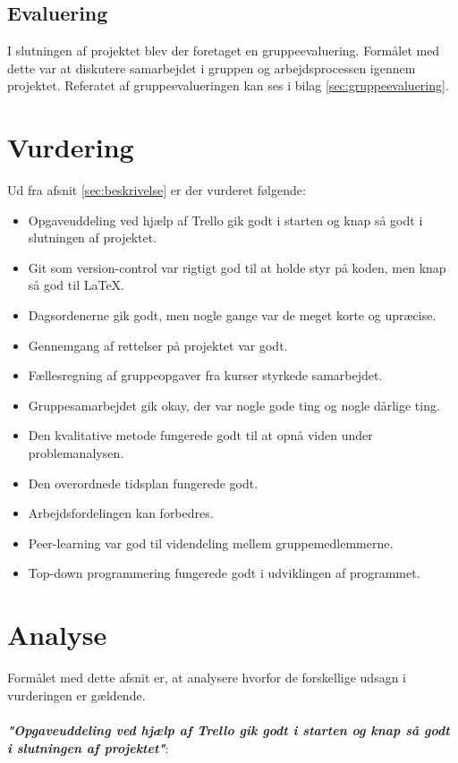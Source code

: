 \documentclass[oneside,a4paper,titlepage]{article}
\begin{document}
\subsection{Evaluering}

I slutningen af projektet blev der foretaget en gruppeevaluering. Formålet med dette var at diskutere samarbejdet i gruppen og arbejdsprocessen igennem projektet. Referatet af gruppeevalueringen kan ses i bilag \ref{sec:gruppeevaluering}.

\section{Vurdering}
Ud fra afsnit \ref{sec:beskrivelse} er der vurderet følgende:
\begin{itemize}
  \item Opgaveuddeling ved hjælp af Trello gik godt i starten og knap så godt i slutningen af projektet.
  \item Git som version-control var rigtigt god til at holde styr på koden, men knap så god til LaTeX.
  \item Dagsordenerne gik godt, men nogle gange var de meget korte og upræcise.
  \item Gennemgang af rettelser på projektet var godt.
  \item Fællesregning af gruppeopgaver fra kurser styrkede samarbejdet.
  \item Gruppesamarbejdet gik okay, der var nogle gode ting og nogle dårlige ting. 
  \item Den kvalitative metode fungerede godt til at opnå viden under problemanalysen.
  \item Den overordnede tidsplan fungerede godt.
  \item Arbejdsfordelingen kan forbedres.
  \item Peer-learning var god til videndeling mellem gruppemedlemmerne.
  \item Top-down programmering fungerede godt i udviklingen af programmet.
\end{itemize}
\setlength\parindent{0pt}
\section{Analyse}
Formålet med dette afsnit er, at analysere hvorfor de forskellige udsagn i vurderingen er gældende.
 \\\\
\textbf{\textit{"Opgaveuddeling ved hjælp af Trello gik godt i starten og knap så godt i slutningen af projektet"}}: \\
\end{document}
